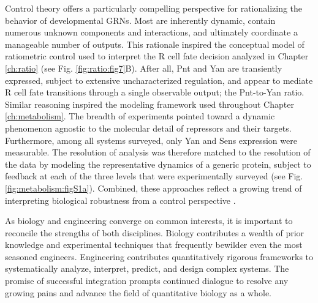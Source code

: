Control theory offers a particularly compelling perspective for rationalizing the behavior of developmental GRNs. Most are inherently dynamic, contain numerous unknown components and interactions, and ultimately coordinate a manageable number of outputs. This rationale inspired the conceptual model of ratiometric control used to interpret the R cell fate decision analyzed in Chapter \ref{ch:ratio} (see Fig. \ref{fig:ratio:fig7}B). After all, Pnt and Yan are transiently expressed, subject to extensive uncharacterized regulation, and appear to mediate R cell fate transitions through a single observable output; the Pnt-to-Yan ratio. Similar reasoning inspired the modeling framework used throughout Chapter \ref{ch:metabolism}. The breadth of experiments pointed toward a dynamic phenomenon agnostic to the molecular detail of repressors and their targets. Furthermore, among all systems surveyed, only Yan and Sens expression were measurable. The resolution of analysis was therefore matched to the resolution of the data by modeling the representative dynamics of a generic protein, subject to feedback at each of the three levels that were experimentally surveyed (see Fig. \ref{fig:metabolism:figS1a}). Combined, these approaches reflect a growing trend of interpreting biological robustness from a control perspective \cite{Khammash2016}. 

As biology and engineering converge on common interests, it is important to reconcile the strengths of both disciplines. Biology contributes a wealth of prior knowledge and experimental techniques that frequently bewilder even the most seasoned engineers. Engineering contributes quantitatively rigorous frameworks to systematically analyze, interpret, predict, and design complex systems. The promise of successful integration prompts continued dialogue to resolve any growing pains and advance the field of quantitative biology as a whole.
